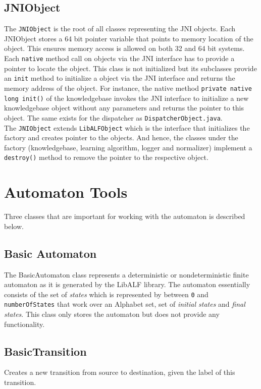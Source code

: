 \subsection*{JNIObject}
The \texttt{JNIObject} is the root of all classes representing the JNI \libalf \cpp objects. Each JNIObject stores a 64 bit pointer variable that points to memory location of the \cpp object. This ensures memory access is allowed on both 32 and 64 bit systems. Each \texttt{native} method call on \cpp objects via the JNI interface has to provide a pointer to locate the object. This class is not initialized but its subclasses provide an \texttt{init} method to initialize a \cpp object via the JNI interface and returns the memory address of the object. For instance, the native method \texttt{private native long init()} of the knowledgebase invokes the JNI interface to initialize a new \cpp knowledgebase object without any parameters and returns the pointer to this object. The same exists for the dispatcher as \texttt{DispatcherObject.java}. \\
The \texttt{JNIObject} extends \texttt{LibALFObject} which is the interface that initializes the factory and creates pointer to the \cpp objects. And hence, the classes under the factory (knowledgebase, learning algorithm, logger and normalizer) implement a \texttt{destroy()} method to remove the pointer to the respective \cpp object. 

\section{Automaton Tools}
Three classes that are important for working with the automaton is described below.

\subsection*{Basic Automaton}
The BasicAutomaton class represents a deterministic or nondeterministic finite automaton as it is generated by the LibALF library.
The automaton essentially consists of the set of \emph{states} which is represented by \integer between \texttt{0} and \texttt{numberOfStates} that work over an Alphabet set, set of \emph{initial states} and \emph{final states}. This class only stores the automaton but does not provide any functionality. 

\subsection*{BasicTransition}
Creates a new transition from source to destination, given the label of this transition.

